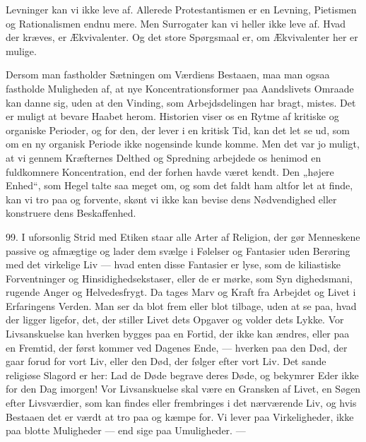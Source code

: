 \documentclass[12pt,a4paper,openany]{book}
\newcommand{\opage}[1]{\marginnote{\footnotesize\textit{[#1]}}}
\begin{document}
Levninger kan vi ikke leve af. Allerede Protestantismen er en Levning,
Pietismen og Rationalismen endnu mere. Men Surrogater kan vi heller ikke
leve af. Hvad der kræves, er Ækvivalenter. Og det store Spørgsmaal er,
om Ækvivalenter her er mulige.

Dersom man fastholder Sætningen om Værdiens Bestaaen, maa man ogsaa
fastholde Muligheden af, at nye Koncentrationsformer paa Aandslivets
Omraade kan danne sig, uden at den Vinding, som Arbejdsdelingen har
bragt, mistes. Det er muligt at bevare Haabet herom. Historien viser os
en Rytme af kritiske og organiske Perioder, og for den, der lever i en
kritisk Tid, kan det let se ud, som om en ny organisk Periode ikke
nogensinde kunde komme. Men det var jo muligt, at vi gennem Kræfternes
Delthed og Spredning arbejdede os henimod en fuldkomnere Koncentration,
end der forhen havde været kendt. Den „højere Enhed“, som Hegel talte
saa meget om, og som det faldt ham altfor let at finde, kan vi tro paa
og forvente, skønt vi ikke kan bevise dens Nødvendighed eller konstruere
dens Beskaffenhed.

99. I uforsonlig Strid med Etiken staar alle Arter af Religion, der gør
Menneskene passive og afmægtige og lader dem svælge i Følelser og
Fantasier uden Berøring med det virkelige Liv --- hvad enten disse
Fantasier er lyse, som de kiliastiske Forventninger og
Hinsidighedsekstaser, eller de er mørke, som Syn%
\opage{225}dighedsmani, rugende Anger og Helvedesfrygt. Da tages Marv og
Kraft fra Arbejdet og Livet i Erfaringens Verden. Man ser da blot frem
eller blot tilbage, uden at se paa, hvad der ligger ligefor, det, der
stiller Livet dets Opgaver og volder dets Lykke. Vor Livsanskuelse kan
hverken bygges paa en Fortid, der ikke kan ændres, eller paa en Fremtid,
der først kommer ved Dagenes Ende, --- hverken paa den Død, der gaar
forud for vort Liv, eller den Død, der følger efter vort Liv. Det sande
religiøse Slagord er her: Lad de Døde begrave deres Døde, og bekymrer
Eder ikke for den Dag imorgen! Vor Livsanskuelse skal være en Gransken
af Livet, en Søgen efter Livsværdier, som kan findes eller frembringes i
det nærværende Liv, og hvis Bestaaen det er værdt at tro paa og kæmpe
for. Vi lever paa Virkeligheder, ikke paa blotte Muligheder --- end sige
paa Umuligheder. ---
\end{document}
